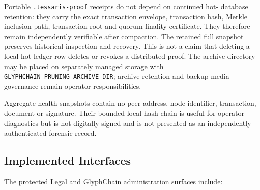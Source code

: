 Portable \texttt{.tessaris-proof} receipts do not depend on continued hot-
database retention: they carry the exact transaction envelope, transaction
hash, Merkle inclusion path, transaction root and quorum-finality certificate.
They therefore remain independently verifiable after compaction. The retained
full snapshot preserves historical inspection and recovery. This is not a claim
that deleting a local hot-ledger row deletes or revokes a distributed proof.
The archive directory may be placed on separately managed storage with
\texttt{GLYPHCHAIN\_PRUNING\_ARCHIVE\_DIR}; archive retention and backup-media
governance remain operator responsibilities.

Aggregate health snapshots contain no peer address, node identifier,
transaction, document or signature. Their bounded local hash chain is useful for
operator diagnostics but is not digitally signed and is not presented as an
independently authenticated forensic record.

\subsection{Implemented Interfaces}

The protected Legal and GlyphChain administration surfaces include:

